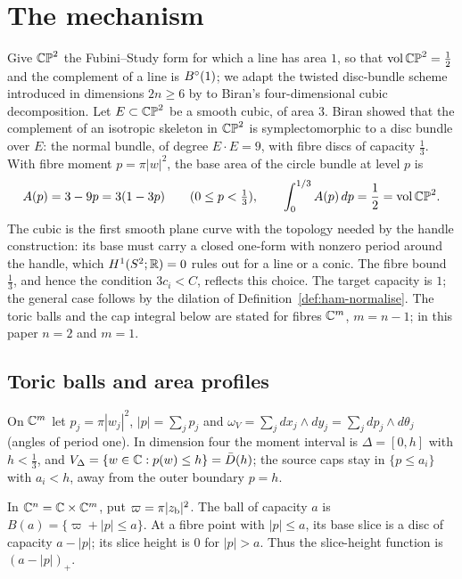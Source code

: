 \section{The mechanism}\label{sec:mech}

Give $\mathbb{CP}^2$ the Fubini--Study form for which a line has area $1$, so that $\operatorname{vol}\mathbb{CP}^2=\frac12$ and the complement of a
line is $B^{\circ}(1)$; we adapt the twisted disc-bundle scheme introduced in dimensions $2n\ge6$ by \cite{OpenAI2026} to
Biran's four-dimensional cubic decomposition. Let $E\subset\mathbb{CP}^2$ be a smooth cubic,
of area $3$. Biran \cite{Biran2001} showed that the complement of an isotropic skeleton in $\mathbb{CP}^2$ is symplectomorphic to
a disc bundle over $E$: the normal bundle, of degree $E\cdot E=9$, with fibre discs of capacity $\frac13$. With fibre
moment $p=\pi|w|^2$, the base area of the circle bundle at level $p$ is
\[
 A(p)=3-9p=3(1-3p)\qquad(0\le p<\tfrac13),\qquad \int_0^{1/3}A(p)\,dp=\frac12=\operatorname{vol}\mathbb{CP}^2 .
\]
The cubic is the first smooth plane curve with the topology needed by the handle construction: its base must carry a
closed one-form with nonzero period around the handle, which $H^1(S^2;\mathbb{R})=0$ rules out for a line or a conic. The fibre
bound $\frac13$, and hence the condition $3c_i<C$, reflects this choice. The target capacity is $1$; the general case follows
by the dilation of Definition~\ref{def:ham-normalise}. The toric balls and the cap integral below are stated for fibres
$\mathbb{C}^m$, $m=n-1$; in this paper $n=2$ and $m=1$.

\subsection{Toric balls and area profiles}\label{sec:mech-toric}

On $\mathbb{C}^m$ let $p_j=\pi|w_j|^2$, $|p|=\sum_jp_j$ and $\omega_V=\sum_jdx_j\wedge dy_j=\sum_jdp_j\wedge d\theta_j$ (angles of period one). In dimension four the moment interval is $\Delta=[0,h]$ with $h<\frac13$, and
$V_\Delta=\{w\in\mathbb{C}:p(w)\le h\}=\bar D(h)$; the source caps stay in $\{p\le a_i\}$ with $a_i<h$, away from the outer
boundary $p=h$.

\begin{definition}\label{def:mech-toric-ball}
In $\mathbb{C}^n=\mathbb{C}\times\mathbb{C}^m$, put $\varpi=\pi|z_{\rm b}|^2$. The ball of capacity $a$ is
$B(a)=\{\varpi+|p|\le a\}$. At a fibre point with $|p|\le a$, its base slice is a disc of capacity $a-|p|$; its slice height is $0$ for $|p|>a$. Thus the slice-height function is $(a-|p|)_+$.
\end{definition}

